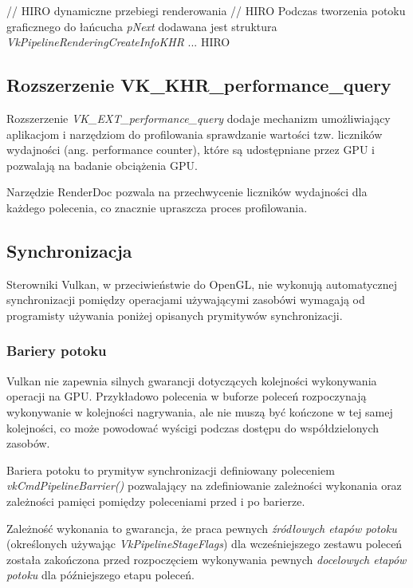 // HIRO dynamiczne przebiegi renderowania
// HIRO  Podczas tworzenia potoku graficznego do łańcucha \textit{pNext} dodawana jest struktura \textit{VkPipelineRenderingCreateInfoKHR} ... HIRO


\subsection{Rozszerzenie VK\_KHR\_performance\_query}

Rozszerzenie \textit{VK\_EXT\_performance\_query} dodaje mechanizm umożliwiający aplikacjom i narzędziom do profilowania sprawdzanie wartości tzw. liczników wydajności (ang. performance counter), które są udostępniane przez GPU i pozwalają na badanie obciążenia GPU.

Narzędzie RenderDoc \cite{RENDERDOC} pozwala na przechwycenie liczników wydajności dla każdego polecenia, co znacznie upraszcza proces profilowania.




\subsection{Synchronizacja}

Sterowniki Vulkan, w przeciwieństwie do OpenGL, nie wykonują automatycznej synchronizacji pomiędzy operacjami używającymi zasobówi wymagają od programisty używania poniżej opisanych prymitywów synchronizacji.

\subsubsection{Bariery potoku}

Vulkan nie zapewnia silnych gwarancji dotyczących kolejności wykonywania operacji na GPU.
Przykładowo polecenia w buforze poleceń rozpoczynają wykonywanie w kolejności nagrywania, ale nie muszą być kończone w tej samej kolejności, co może powodować wyścigi podczas dostępu do współdzielonych zasobów.

Bariera potoku to prymityw synchronizacji definiowany poleceniem \textit{vkCmdPipelineBarrier()} pozwalający na zdefiniowanie zależności wykonania oraz zależności pamięci pomiędzy poleceniami przed i po barierze.

Zależność wykonania to gwarancja, że praca pewnych \textit{źródłowych etapów potoku} (określonych używając
\textit{VkPipelineStageFlags}) dla wcześniejszego zestawu poleceń została zakończona przed rozpoczęciem wykonywania pewnych
\textit{docelowych etapów potoku} dla późniejszego etapu poleceń. 

